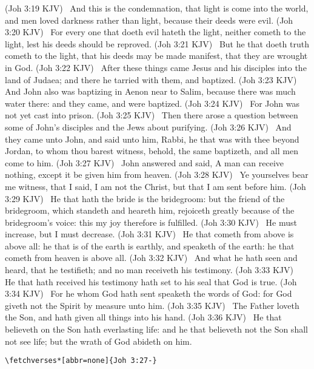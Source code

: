 \documentclass{article}
\begin{document}
\begin{declareBVs*}
\BV(Joh 3:19 KJV)  And this is the condemnation, that light is come into the world, and men loved darkness rather than light, because their deeds were evil.\null
\BV(Joh 3:20 KJV)  For every one that doeth evil hateth the light, neither cometh to the light, lest his deeds should be reproved.\null
\BV(Joh 3:21 KJV)  But he that doeth truth cometh to the light, that his deeds may be made manifest, that they are wrought in God.\null
\BV(Joh 3:22 KJV)  After these things came Jesus and his disciples into the land of Judaea; and there he tarried with them, and baptized.\null
\BV(Joh 3:23 KJV)  And John also was baptizing in Aenon near to Salim, because there was much water there: and they came, and were baptized.\null
\BV(Joh 3:24 KJV)  For John was not yet cast into prison.\null
\BV(Joh 3:25 KJV)  Then there arose a question between some of John's disciples and the Jews about purifying.\null
\BV(Joh 3:26 KJV)  And they came unto John, and said unto him, Rabbi, he that was with thee beyond Jordan, to whom thou barest witness, behold, the same baptizeth, and all men come to him.\null
\BV(Joh 3:27 KJV)  John answered and said, A man can receive nothing, except it be given him from heaven.\null
\BV(Joh 3:28 KJV)  Ye yourselves bear me witness, that I said, I am not the Christ, but that I am sent before him.\null
\BV(Joh 3:29 KJV)  He that hath the bride is the bridegroom: but the friend of the bridegroom, which standeth and heareth him, rejoiceth greatly because of the bridegroom's voice: this my joy therefore is fulfilled.\null
\BV(Joh 3:30 KJV)  He must increase, but I must decrease.\null
\BV(Joh 3:31 KJV)  He that cometh from above is above all: he that is of the earth is earthly, and speaketh of the earth: he that cometh from heaven is above all.\null
\BV(Joh 3:32 KJV)  And what he hath seen and heard, that he testifieth; and no man receiveth his testimony.\null
\BV(Joh 3:33 KJV)  He that hath received his testimony hath set to his seal that God is true.\null
\BV(Joh 3:34 KJV)  For he whom God hath sent speaketh the words of God: for God giveth not the Spirit by measure unto him.\null
\BV(Joh 3:35 KJV)  The Father loveth the Son, and hath given all things into his hand.\null
\BV(Joh 3:36 KJV)  He that believeth on the Son hath everlasting life: and he that believeth not the Son shall not see life; but the wrath of God abideth on him.\null
\end{declareBVs*}


\verb~\fetchverses*[abbr=none]{Joh 3:27-}~\\
\end{document}

